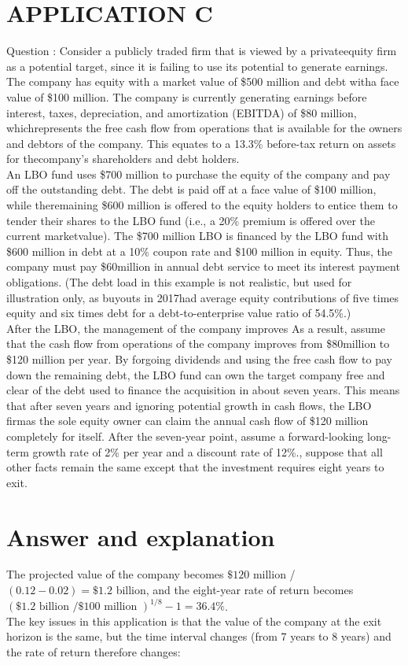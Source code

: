 \documentclass[11pt]{article}
\begin{document}
\section*{APPLICATION C}
Question : Consider a publicly traded firm that is viewed by a privateequity firm as a potential target, since it is failing to use its potential to generate earnings. The company has equity with a market value of \$500 million and debt witha face value of \$100 million. The company is currently generating earnings before interest, taxes, depreciation, and amortization (EBITDA) of \$80 million, whichrepresents the free cash flow from operations that is available for the owners and debtors of the company. This equates to a 13.3\% before-tax return on assets for thecompany’s shareholders and debt holders.\\
An LBO fund uses \$700 million to purchase the equity of the company and pay off the outstanding debt. The debt is paid off at a face value of \$100 million, while theremaining \$600 million is offered to the equity holders to entice them to tender their shares to the LBO fund (i.e., a 20\% premium is offered over the current marketvalue). The \$700 million LBO is financed by the LBO fund with \$600 million in debt at a 10\% coupon rate and \$100 million in equity. Thus, the company must pay \$60million in annual debt service to meet its interest payment obligations. (The debt load in this example is not realistic, but used for illustration only, as buyouts in 2017had average equity contributions of five times equity and six times debt for a debt-to-enterprise value ratio of 54.5\%.)\\
After the LBO, the management of the company improves As a result, assume that the cash flow from operations of the company improves from \$80million to \$120 million per year. By forgoing dividends and using the free cash flow to pay down the remaining debt, the LBO fund can own the target company free and clear of the debt used to finance the acquisition in about seven years. This means that after seven years and ignoring potential growth in cash flows, the LBO firmas the sole equity owner can claim the annual cash flow of \$120 million completely for itself. After the seven-year point, assume a forward-looking long-term growth rate of 2\% per year and a discount rate of 12\%., suppose that all other facts remain the same except that the investment requires eight years to exit.

\section*{Answer and explanation}
The projected value of the company becomes $\$ 120$ million / $(0.12-0.02)=\$ 1.2$ billion, and the eight-year rate of return becomes $(\$ 1.2 \text { billion } / \$ 100 \text { million })^{1 / 8}-1=36.4 \%$.\\
The key issues in this application is that the value of the company at the exit horizon is the same, but the time interval changes (from 7 years to 8 years) and the rate of return therefore changes:
\end{document}
